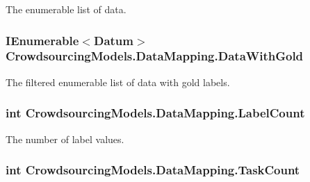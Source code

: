 The enumerable list of data. 

\hypertarget{class_crowdsourcing_models_1_1_data_mapping_a4baf480d5c8dcce5ecbf8ebeb9a55901}{}
\subsubsection[{Data\+With\+Gold}]{\setlength{\rightskip}{0pt plus 5cm}I\+Enumerable$<${\bf Datum}$>$ Crowdsourcing\+Models.\+Data\+Mapping.\+Data\+With\+Gold\hspace{0.3cm}{\ttfamily [get]}}\label{class_crowdsourcing_models_1_1_data_mapping_a4baf480d5c8dcce5ecbf8ebeb9a55901}


The filtered enumerable list of data with gold labels. 

\hypertarget{class_crowdsourcing_models_1_1_data_mapping_aecfecfc671fd79ea8ff2c1b7cb9c9846}{}
\subsubsection[{Label\+Count}]{\setlength{\rightskip}{0pt plus 5cm}int Crowdsourcing\+Models.\+Data\+Mapping.\+Label\+Count\hspace{0.3cm}{\ttfamily [get]}}\label{class_crowdsourcing_models_1_1_data_mapping_aecfecfc671fd79ea8ff2c1b7cb9c9846}


The number of label values. 

\hypertarget{class_crowdsourcing_models_1_1_data_mapping_aa548c66dcf33e58829a676081b84c974}{}
\subsubsection[{Task\+Count}]{\setlength{\rightskip}{0pt plus 5cm}int Crowdsourcing\+Models.\+Data\+Mapping.\+Task\+Count\hspace{0.3cm}{\ttfamily [get]}}\label{class_crowdsourcing_models_1_1_data_mapping_aa548c66dcf33e58829a676081b84c974}


